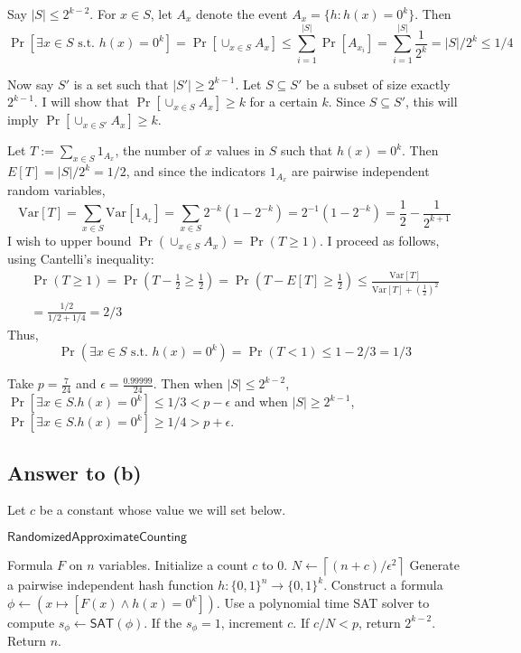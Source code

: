 \documentclass{article}
\begin{document}
Say $|S| \leq 2^{k - 2}$.
For $x \in S$, let $A_x$ denote the event $A_x = \{h : h(x) = 0^k\}$.
Then 
$$
	\Pr[\exists x \in S \text{ s.t. } h(x) = 0^k]
	= \Pr[\cup_{x \in S} A_x]
	\leq
	\sum_{i=1}^{|S|} \Pr[A_{x_i}]
	= \sum_{i=1}^{|S|} \frac{1}{2^k}
	= |S|/2^k
	\leq 1/4
$$

\medskip
\noindent
Now say $S'$ is a set such that $|S'| \geq 2^{k-1}$.
Let $S \subseteq S'$ be a subset of size exactly $2^{k-1}$.
I will show that $\Pr[\cup_{x \in S}A_x] \geq k$ for a certain $k$.
Since $S \subseteq S'$, this will imply $\Pr[\cup_{x \in S'}A_x] \geq k$.

Let $T := \sum_{x \in S}1_{A_x}$, the number of $x$ values in $S$ such that $h(x) = 0^k$.
Then $E[T] = |S|/2^k = 1/2$, and
since the indicators $1_{A_x}$ are pairwise independent random variables,
$$
\text{Var}[T] = \sum_{x \in S} \text{Var}[1_{A_x}]
= \sum_{x \in S} 2^{-k}(1 - 2^{-k})
= 2^{-1}(1 - 2^{-k}) = \frac{1}{2} - \frac{1}{2^{k+1}}
$$
I wish to upper bound $\Pr(\cup_{x \in S} A_x) = \Pr(T \geq 1)$.
I proceed as follows, using Cantelli's inequality:
\begin{multline*}
\Pr(T \geq 1) = \Pr(T - \frac{1}{2} \geq \frac{1}{2}) = \Pr(T - E[T] \geq \frac{1}{2})
\leq \frac{\text{Var}[T]}{\text{Var}[T] + (\frac{1}{2})^2} \\
= \frac{1/2}{1/2 + 1/4} = 2/3
\end{multline*}
Thus,
$$
\Pr(\exists x \in S \text{ s.t. } h(x) = 0^k) = \Pr(T < 1) \leq 1 - 2/3 = 1/3
$$

\medskip
\noindent
Take $p = \frac{7}{24}$ and $\epsilon = \frac{0.99999}{24}$.
Then when $|S| \leq 2^{k-2}$, $\Pr[\exists x \in S . h(x) =0^k] \leq 1/3 < p - \epsilon$
and when $|S| \geq 2^{k-1}$, $\Pr[\exists x \in S . h(x) =0^k] \geq 1/4 > p + \epsilon$.

\subsection*{Answer to (b)}

Let $c$ be a constant whose value we will set below.

\begin{algorithm}{$\mathsf{RandomizedApproximateCounting}$}
\begin{algorithmic}[1]
\Require Formula $F$ on $n$ variables.
	\State Initialize a count $c$ to $0$.
	\State $N \gets \left \lceil{(n + c)/\epsilon^2}\right \rceil$
		\State Generate a pairwise independent hash function $h : \{0, 1\}^n \to \{0, 1\}^k$.
		\State Construct a formula $\phi \gets (x \mapsto [F(x) \wedge h(x) = 0^k])$.
		\State Use a polynomial time SAT solver to compute $s_\phi \gets \mathsf{SAT}(\phi)$.
		\State If the $s_\phi = 1$, increment $c$.
	\EndFor
	\State If $c / N < p$, return $2^{k-2}$.
\EndFor
\State Return $n$.
\end{algorithmic}
\end{algorithm}
\end{document}
